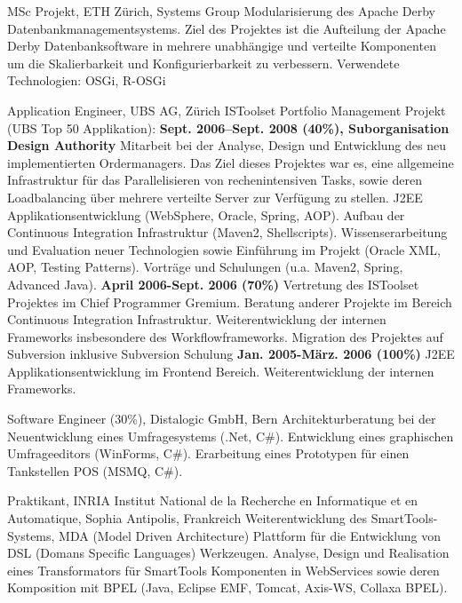 \documentclass[10pt]{moderncv}
\begin{document}
{MSc Projekt, ETH Z\"urich, Systems Group}
{Modularisierung des Apache Derby Datenbankmanagementsystems.\smallpara
Ziel des Projektes ist die Aufteilung der Apache Derby Datenbanksoftware in mehrere unabh\"angige und verteilte Komponenten um die Skalierbarkeit und Konfigurierbarkeit zu verbessern. Verwendete Technologien: OSGi, R-OSGi}

{Application Engineer, UBS AG, Z\"urich}
{ISToolset Portfolio Management Projekt (UBS Top 50 Applikation): \smallpara 
\textbf{Sept. 2006--Sept. 2008 (40\%), Suborganisation Design Authority} \smallpara
Mitarbeit bei der Analyse, Design und Entwicklung des neu implementierten Ordermanagers. Das Ziel dieses Projektes war es, eine allgemeine Infrastruktur f\"ur das Parallelisieren von rechenintensiven Tasks, sowie deren Loadbalancing \"uber mehrere verteilte Server zur Verf\"ugung zu stellen.\smallpara
J2EE Applikationsentwicklung (WebSphere, Oracle, Spring, AOP). Aufbau der Continuous Integration Infrastruktur (Maven2, Shellscripts).\smallpara
Wissenserarbeitung und Evaluation neuer Technologien sowie Einf\"uhrung im Projekt (Oracle XML, AOP, Testing Patterns). Vortr\"age und Schulungen (u.a. Maven2, Spring, Advanced Java). \smallpara
\textbf{April 2006-Sept. 2006 (70\%)} \smallpara
Vertretung des ISToolset Projektes im Chief Programmer Gremium. Beratung anderer Projekte im Bereich Continuous Integration Infrastruktur. \smallpara
Weiterentwicklung der internen Frameworks insbesondere des Workflowframeworks. Migration des Projektes auf Subversion inklusive Subversion Schulung \smallpara
\textbf{Jan. 2005-M\"arz. 2006 (100\%)} \smallpara
J2EE Applikationsentwicklung im Frontend Bereich. Weiterentwicklung der internen Frameworks.}

{Software Engineer (30\%), Distalogic GmbH, Bern}
{Architekturberatung bei der Neuentwicklung eines Umfragesystems (.Net, C\#).\smallpara
Entwicklung eines graphischen Umfrageeditors (WinForms, C\#).\smallpara
Erarbeitung eines Prototypen f\"ur einen Tankstellen POS (MSMQ, C\#).}

{Praktikant, INRIA Institut National de la Recherche en Informatique et en Automatique, Sophia Antipolis, Frankreich}
{Weiterentwicklung des SmartTools-Systems, MDA (Model Driven Architecture) Plattform f\"ur die Entwicklung von DSL (Domans Specific Languages) Werkzeugen.\smallpara
Analyse, Design und Realisation eines Transformators f\"ur SmartTools Komponenten in WebServices sowie deren Komposition mit BPEL (Java, Eclipse EMF, Tomcat, Axis-WS, Collaxa BPEL).}
\end{document}
